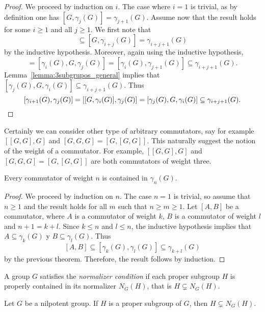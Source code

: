 \begin{proof}
	We proceed by induction on $i$. The case where $i=1$ is trivial, as by definition one has 
	$[G,\gamma_j(G)]=\gamma_{j+1}(G)$. Assume now that the result holds for 
	some $i\geq1$ and all $j\geq1$. 
	We first note that 	
	\begin{equation*}
		[G,\gamma_i(G),\gamma_j(G)]\subseteq [G,\gamma_{i+j}(G)]= \gamma_{i+j+1}(G)
	\end{equation*}
	by the inductive hypothesis. Moreover, again using the inductive hypothesis,  
	\begin{equation*}
	[\gamma_i(G),\gamma_j(G),G]=[\gamma_{i}(G),G,\gamma_{j}(G)]=[\gamma_i(G),\gamma_{j+1}(G)]\subseteq \gamma_{i+j+1}(G).
	\end{equation*}
	Lemma~\ref{lemma:3subgrupos_general} implies that 
	$[\gamma_j(G),G,\gamma_i(G)]\subseteq \gamma_{i+j+1}(G)$. Thus  
	\[
	[\gamma_{i+1}(G),\gamma_{j}(G)]=[[G,\gamma_{i}(G)],\gamma_j(G)]=[\gamma_j(G),G,\gamma_i(G)]
	\subseteq \gamma_{i+j+1}(G).\qedhere
	\]
\end{proof}

Certainly we can consider other type of arbitrary commutators, say for example 
$[[G,G],G]$ and $[G,G,G]=[G,[G,G]]$. This naturally suggest the notion of the
weight of a commutator. For example, $[[G,G],G]$ and $[G,G,G]=[G,[G,G]]$ are
both commutators of weight three. 

\begin{corollary}
	Every commutator of weight $n$ is contained in 
	$\gamma_n(G)$.
\end{corollary}

\begin{proof}
	We proceed by induction on $n$. The case $n=1$ is trivial, so assume that $n\geq 1$ and
	the result holds for all $m$ such that  $n\geq m\geq 1$.  Let  
	$[A,B]$ be a commutator, where $A$ is a commutator of weight $k$,
	$B$ is a commutator of weight $l$ and $n+1=k+l$. Since $k\leq n$ and $l\leq n$, the inductive 
	hypothesis implies that $A\subseteq \gamma_k(G)$ y $B\subseteq
	\gamma_l(G)$. Thus 
	\[
	[A,B]\subseteq [\gamma_k(G),\gamma_l(G)]\subseteq
	\gamma_{k+l}(G)
	\]
	by the previous theorem. Therefore, the result follows by induction.
\end{proof}

A group 
$G$ satisfies the {\em normalizer condition} if each  proper subgroup $H$ is properly contained in its normalizer $N_G(H)$, that is $H\subsetneq N_G(H)$. 

\begin{lemma}
	\label{lem:normalizer}
	Let $G$ be a nilpotent group. If $H$ is a proper subgroup of $G$, then 
	$H\subsetneq N_G(H)$.
\end{lemma}

